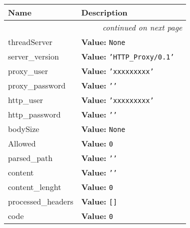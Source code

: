     \vspace{-1cm}
\hspace{\varindent}\begin{longtable}{|p{\varnamewidth}|p{\vardescrwidth}|l}
\cline{1-2}
\cline{1-2} \centering \textbf{Name} & \centering \textbf{Description}& \\
\cline{1-2}
\endhead\cline{1-2}\multicolumn{3}{r}{\small\textit{continued on next page}}\\\endfoot\cline{1-2}
\endlastfoot\raggedright t\-h\-r\-e\-a\-d\-S\-e\-r\-v\-e\-r\- & \raggedright \textbf{Value:} 
{\tt None}&\\
\cline{1-2}
\raggedright s\-e\-r\-v\-e\-r\-\_\-v\-e\-r\-s\-i\-o\-n\- & \raggedright \textbf{Value:} 
{\tt \texttt{'}\texttt{HTTP\_Proxy/0.1}\texttt{'}}&\\
\cline{1-2}
\raggedright p\-r\-o\-x\-y\-\_\-u\-s\-e\-r\- & \raggedright \textbf{Value:} 
{\tt \texttt{'}\texttt{xxxxxxxxx}\texttt{'}}&\\
\cline{1-2}
\raggedright p\-r\-o\-x\-y\-\_\-p\-a\-s\-s\-w\-o\-r\-d\- & \raggedright \textbf{Value:} 
{\tt \texttt{'}\texttt{}\texttt{'}}&\\
\cline{1-2}
\raggedright h\-t\-t\-p\-\_\-u\-s\-e\-r\- & \raggedright \textbf{Value:} 
{\tt \texttt{'}\texttt{xxxxxxxxx}\texttt{'}}&\\
\cline{1-2}
\raggedright h\-t\-t\-p\-\_\-p\-a\-s\-s\-w\-o\-r\-d\- & \raggedright \textbf{Value:} 
{\tt \texttt{'}\texttt{}\texttt{'}}&\\
\cline{1-2}
\raggedright b\-o\-d\-y\-S\-i\-z\-e\- & \raggedright \textbf{Value:} 
{\tt None}&\\
\cline{1-2}
\raggedright A\-l\-l\-o\-w\-e\-d\- & \raggedright \textbf{Value:} 
{\tt 0}&\\
\cline{1-2}
\raggedright p\-a\-r\-s\-e\-d\-\_\-p\-a\-t\-h\- & \raggedright \textbf{Value:} 
{\tt \texttt{'}\texttt{}\texttt{'}}&\\
\cline{1-2}
\raggedright c\-o\-n\-t\-e\-n\-t\- & \raggedright \textbf{Value:} 
{\tt \texttt{'}\texttt{}\texttt{'}}&\\
\cline{1-2}
\raggedright c\-o\-n\-t\-e\-n\-t\-\_\-l\-e\-n\-g\-h\-t\- & \raggedright \textbf{Value:} 
{\tt 0}&\\
\cline{1-2}
\raggedright p\-r\-o\-c\-e\-s\-s\-e\-d\-\_\-h\-e\-a\-d\-e\-r\-s\- & \raggedright \textbf{Value:} 
{\tt \texttt{[}\texttt{]}}&\\
\cline{1-2}
\raggedright c\-o\-d\-e\- & \raggedright \textbf{Value:} 
{\tt 0}&\\
\cline{1-2}

\end{longtable}

